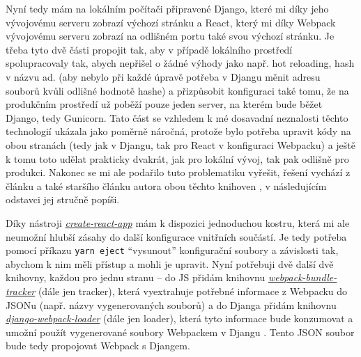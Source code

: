     Nyní tedy mám na lokálním počítači připravené Django, které mi díky jeho vývojovému serveru zobrazí výchozí stránku a React, který mi díky Webpack vývojovému serveru zobrazí na odlišném portu také svou výchozí stránku. Je třeba tyto dvě části propojit tak, aby v případě lokálního prostředí spolupracovaly tak, abych nepřišel o žádné výhody jako např. hot reloading, hash v názvu ad. (aby nebylo při každé úpravě potřeba v Djangu měnit adresu souborů kvůli odlišné hodnotě hashe) a přizpůsobit konfiguraci také tomu, že na produkčním prostředí už poběží pouze jeden server, na kterém bude běžet Django, tedy Gunicorn. Tato část se vzhledem k mé dosavadní neznalosti těchto technologií ukázala jako poměrně náročná, protože bylo potřeba upravit kódy na obou stranách (tedy jak v Djangu, tak pro React v konfiguraci Webpacku) a ještě k tomu toto udělat prakticky dvakrát, jak pro lokální vývoj, tak pak odlišně pro produkci. Nakonec se mi ale podařilo tuto problematiku vyřešit, řešení vychází z článku \cite{webpack-loader2} a také staršího článku autora obou těchto knihoven \cite{webpack-loader1}, v následujícím odstavci jej stručně popíši.
    
    Díky nástroji \href{https://github.com/facebook/create-react-app}{\textit{create-react-app}} \cite{cra} mám k dispozici jednoduchou kostru, která mi ale neumožní hlubší zásahy do další konfigurace vnitřních součástí. Je tedy potřeba pomocí příkazu \verb|yarn eject| \enquote{vysunout} konfigurační soubory a závislosti tak, abychom k nim měli přístup a mohli je upravit. Nyní potřebuji dvě další dvě knihovny, každou pro jednu stranu -- do JS přidám knihovnu \href{https://github.com/owais/webpack-bundle-tracker}{\textit{webpack-bundle-tracker}} (dále jen tracker), která vyextrahuje potřebné informace z Webpacku do JSONu \cite{webpack-bundle-tracker} (např. názvy vygenerovaných souborů) a do Djanga přidám knihovnu \href{https://github.com/owais/django-webpack-loader}{\textit{django-webpack-loader}} (dále jen loader), která tyto informace bude konzumovat a umožní použít vygenerované soubory Webpackem v Djangu \cite{django-webpack-loader}. Tento JSON soubor bude tedy propojovat Webpack s Djangem.
    
